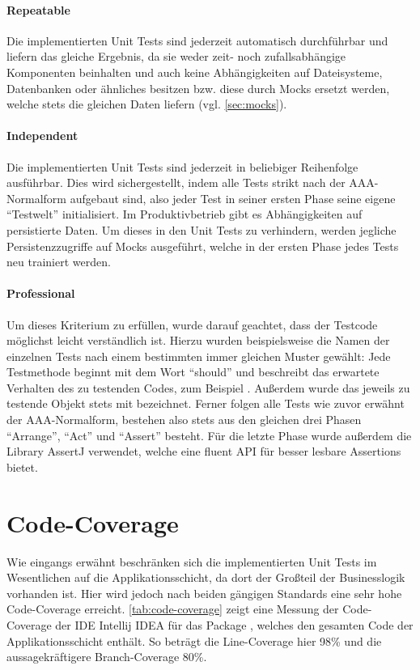 \paragraph{Repeatable} Die implementierten Unit Tests sind jederzeit automatisch durchführbar und liefern das gleiche Ergebnis, da sie weder zeit- noch zufallsabhängige Komponenten beinhalten und auch keine Abhängigkeiten auf Dateisysteme, Datenbanken oder ähnliches besitzen bzw. diese durch Mocks ersetzt werden, welche stets die gleichen Daten liefern (vgl. \autoref{sec:mocks}).

\paragraph{Independent} Die implementierten Unit Tests sind jederzeit in beliebiger Reihenfolge ausführbar. Dies wird sichergestellt, indem alle Tests strikt nach der AAA-Normalform aufgebaut sind, also jeder Test in seiner ersten Phase seine eigene \enquote{Testwelt} initialisiert. Im Produktivbetrieb gibt es Abhängigkeiten auf persistierte Daten. Um dieses in den Unit Tests zu verhindern, werden jegliche Persistenzzugriffe auf Mocks ausgeführt, welche in der ersten Phase jedes Tests neu trainiert werden.

\paragraph{Professional} Um dieses Kriterium zu erfüllen, wurde darauf geachtet, dass der Testcode möglichst leicht verständlich ist. Hierzu wurden beispielsweise die Namen der einzelnen Tests nach einem bestimmten immer gleichen Muster gewählt: Jede Testmethode beginnt mit dem Wort \enquote{should} und beschreibt das erwartete Verhalten des zu testenden Codes, zum Beispiel . Außerdem wurde das jeweils zu testende Objekt stets mit  bezeichnet. Ferner folgen alle Tests wie zuvor erwähnt der AAA-Normalform, bestehen also stets aus den gleichen drei Phasen \enquote{Arrange}, \enquote{Act} und \enquote{Assert} besteht. Für die letzte Phase wurde außerdem die Library AssertJ verwendet, welche eine fluent \ac{API} für besser lesbare Assertions bietet.

\section{Code-Coverage}
\label{sec:code-coverage}
Wie eingangs erwähnt beschränken sich die implementierten Unit Tests im Wesentlichen auf die Applikationsschicht, da dort der Großteil der Businesslogik vorhanden ist. Hier wird jedoch nach beiden gängigen Standards eine sehr hohe Code-Coverage erreicht. \autoref{tab:code-coverage} zeigt eine Messung der Code-Coverage der \acs{IDE} Intellij IDEA für das Package , welches den gesamten Code der Applikationsschicht enthält. So beträgt die Line-Coverage hier 98\% und die aussagekräftigere Branch-Coverage 80\%.

